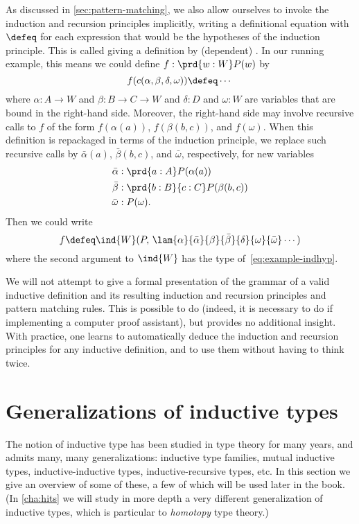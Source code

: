 As discussed in \cref{sec:pattern-matching}, we also allow ourselves to invoke the induction and recursion principles implicitly, writing a definitional equation with $\defeq$ for each expression that would be the hypotheses of the induction principle.
This is called giving a definition by (dependent) .
%
%
In our running example, this means we could define $f:\prd{w:W} P(w) $ by
\[ f(c(\alpha,\beta,\delta,\omega)) \defeq \cdots \]
where $\alpha:A\to W$ and $\beta:B\to C\to W$ and $\delta:D$ and $\omega:W$ are variables
%
that are bound in the right-hand side.
Moreover, the right-hand side may involve recursive calls to $f$ of the form $f(\alpha(a))$, $f(\beta(b,c))$, and $f(\omega)$.
When this definition is repackaged in terms of the induction principle, we replace such recursive calls by $\bar\alpha(a)$, $\bar\beta(b,c)$, and $\bar\omega$, respectively, for new variables
\begin{align*}
  \bar\alpha &: \prd{a:A} P(\alpha(a))\\
  \bar\beta &: \prd{b:B}{c:C} P(\beta(b,c))\\
  \bar\omega &: P(\omega).
\end{align*}
%
Then we could write
\[ f \defeq \ind{W}(P,\, \lam{\alpha}{\bar\alpha}{\beta}{\bar\beta}{\delta}{\omega}{\bar\omega} \cdots ) \]
where the second argument to $\ind{W}$ has the type of~\eqref{eq:example-indhyp}.

We will not attempt to give a formal presentation of the grammar of a valid inductive definition and its resulting induction and recursion principles and pattern matching rules.
This is possible to do (indeed, it is necessary to do if implementing a computer proof assistant), but provides no additional insight.
With practice, one learns to automatically deduce the induction and recursion principles for any inductive definition, and to use them without having to think twice.


\section{Generalizations of inductive types}
\label{sec:generalizations}

%
The notion of inductive type has been studied in type theory for many years, and admits many, many generalizations: inductive type families, mutual inductive types, inductive-inductive types, inductive-recur\-sive types, etc.
In this section we give an overview of some of these, a few of which will be used later in the book.
(In \cref{cha:hits} we will study in more depth a very different generalization of inductive types, which is particular to \emph{homotopy} type theory.)

